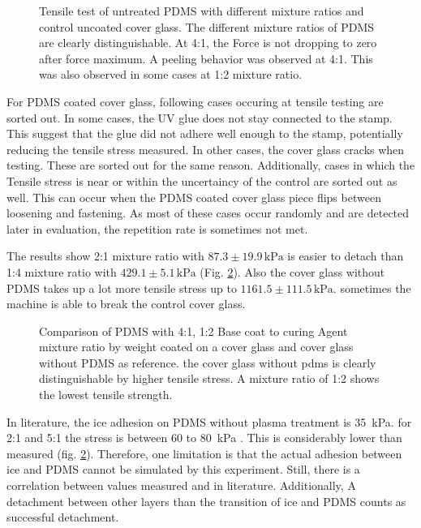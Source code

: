 \begin{figure}[hbt!]
	\centering
	
	\caption{Tensile test of untreated PDMS with different mixture ratios and control uncoated cover glass. The different mixture ratios of PDMS are clearly distinguishable. At 4:1, the Force is not dropping to zero after force maximum. A peeling behavior was observed at 4:1. This was also observed in some cases at 1:2 mixture ratio.}
	\label{fig:forceOverTime}
\end{figure}

For PDMS coated cover glass, following cases occuring at tensile testing are sorted out. In some cases, the UV glue does not stay connected to the stamp. This suggest that the glue did not adhere well enough to the stamp, potentially reducing the tensile stress measured. In other cases, the cover glass cracks when testing. These are sorted out for the same reason. Additionally, cases in which the Tensile stress is near or within the uncertaincy of the control are sorted out as well. This can occur when the PDMS coated cover glass piece flips between loosening and fastening. As most of these cases occur randomly and are detected later in evaluation, the repetition rate is sometimes not met.

The results show 2:1 mixture ratio with $87.3\pm19.9\,\si{\kilo\pascal}$ is easier to detach than 1:4 mixture ratio with $429.1\pm5.1\,\si{\kilo\pascal}$ (Fig. \ref{fig:vgl4:1zu1:2zuGlas}). Also the cover glass without PDMS takes up a lot more tensile stress up to $1161.5\pm111.5\,\si{\kilo\pascal}$. sometimes the machine is able to break the control cover glass. 


\begin{figure}[hbt!]
	\centering	
	
	\caption{Comparison of PDMS with 4:1, 1:2 Base coat to curing Agent mixture ratio by weight coated on a cover glass and cover glass without PDMS as reference. the cover glass without pdms is clearly distinguishable by higher tensile stress. A mixture ratio of 1:2 shows the lowest tensile strength.}
	\label{fig:vgl4:1zu1:2zuGlas}
\end{figure}


In literature, the ice adhesion on PDMS without plasma treatment is \SI{35}{\kilo\pascal}. for 2:1 and 5:1 the stress is between $60$ to \SI{80}{\kilo\pascal} \cite{IbanezIbanez.2022}. This is considerably lower than measured (fig. \ref{fig:vgl4:1zu1:2zuGlas}). Therefore, one limitation is that the actual adhesion between ice and PDMS cannot be simulated by this experiment. Still, there is a correlation between values measured and in literature. Additionally, A detachment between other layers than the transition of ice and PDMS counts as successful detachment. 

